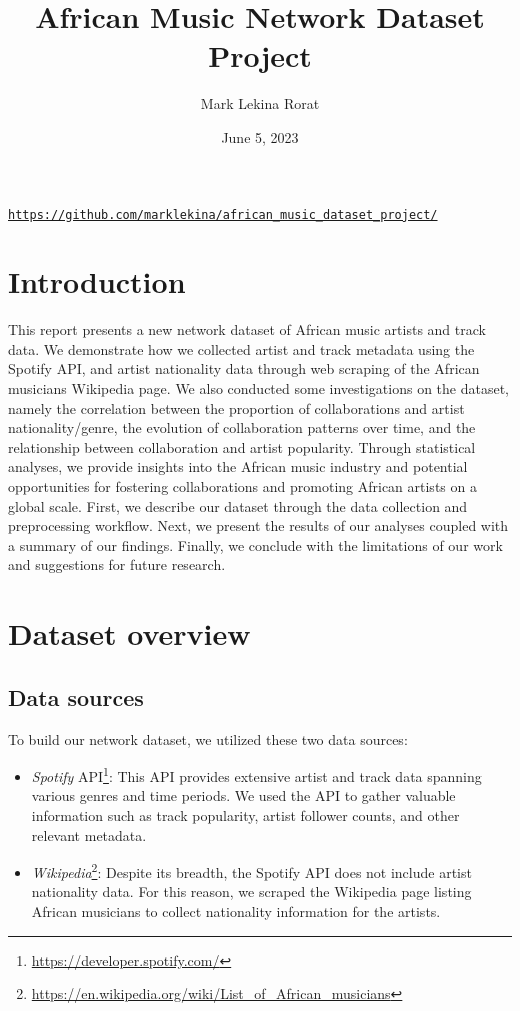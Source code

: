 \documentclass{article}
\title{African Music Network Dataset Project}
\author{Mark Lekina Rorat}
\date{June 5, 2023}
\begin{document}
\maketitle

\begin{center}
    \texttt{\url{https://github.com/marklekina/african_music_dataset_project/}}
\end{center}

\doublespacing\section{Introduction}

This report presents a new network dataset of African music artists and track
data. We demonstrate how we collected artist and track metadata using the
Spotify API, and artist nationality data through web scraping of the African
musicians Wikipedia page. We also conducted some investigations on the dataset,
namely the correlation between the proportion of collaborations and artist
nationality/genre, the evolution of collaboration patterns over time, and the
relationship between collaboration and artist popularity. Through statistical
analyses, we provide insights into the African music industry and potential
opportunities for fostering collaborations and promoting African artists on a
global scale. First, we describe our dataset through the data collection and
preprocessing workflow. Next, we present the results of our analyses coupled
with a summary of our findings. Finally, we conclude with the limitations of
our work and suggestions for future research.

\section{Dataset overview}
\subsection{Data sources}

To build our network dataset, we utilized these two data sources:

\begin{itemize}
    \item \textit{Spotify} API\footnote{\url{https://developer.spotify.com/}}: This API provides extensive artist and track data spanning various genres and time periods. We used the API to gather valuable information such as track popularity, artist follower counts, and other relevant metadata.

    \item \textit{Wikipedia}\footnote{\url{https://en.wikipedia.org/wiki/List_of_African_musicians}}: Despite its breadth, the Spotify API does not include artist nationality data. For this reason, we scraped the Wikipedia page listing African musicians to collect nationality information for the artists.
\end{itemize}
\end{document}
